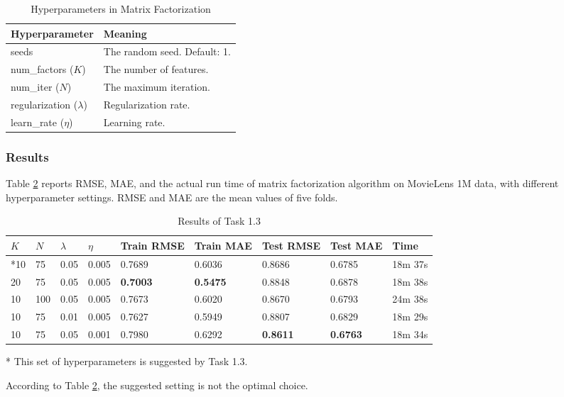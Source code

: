 \documentclass[12pt]{article}
\begin{document}
\begin{table}[ht]
    \centering
    \caption{Hyperparameters in Matrix Factorization}
    \label{tab:1.3-hyper}
    \begin{tabular}{ll}
        \toprule
        \textbf{Hyperparameter} & \textbf{Meaning}\\
        \midrule
        seeds & The random seed. Default: 1.\\
        num\_factors ($K$) & The number of features.\\
        num\_iter ($N$) & The maximum iteration.\\
        regularization ($\lambda$) & Regularization rate.\\
        learn\_rate ($\eta$) & Learning rate.\\
        \bottomrule
    \end{tabular}
\end{table}

\subsubsection{Results}
Table \ref{tab:1.3-results} reports RMSE, MAE, and the actual run time of matrix factorization algorithm on MovieLens 1M data, with different hyperparameter settings. RMSE and MAE are the mean values of five folds.
\begin{table}[ht]
    \centering
    \caption{Results of Task 1.3}
    \label{tab:1.3-results}
    \begin{threeparttable}
    \begin{tabular}{lllllllll}
        \toprule
        \textbf{$K$} & \textbf{$N$} & \textbf{$\lambda$} & \textbf{$\eta$} & \textbf{Train RMSE} & \textbf{Train MAE} & \textbf{Test RMSE} & \textbf{Test MAE} & \textbf{Time}\\
        \midrule
        *10 & 75 & 0.05 & 0.005 & 0.7689 & 0.6036 & 0.8686 & 0.6785 & 18m 37s\\
        20 & 75 & 0.05 & 0.005 & \textbf{0.7003} & \textbf{0.5475} & 0.8848 & 0.6878 & 18m 38s\\
        10 & 100 & 0.05 & 0.005 & 0.7673 & 0.6020 & 0.8670 & 0.6793 & 24m 38s\\
        10 & 75 & 0.01 & 0.005 & 0.7627 & 0.5949 & 0.8807 & 0.6829 & 18m 29s\\
        10 & 75 & 0.05 & 0.001 & 0.7980 & 0.6292 & \textbf{0.8611} & \textbf{0.6763} & 18m 34s\\
        \bottomrule
    \end{tabular}
    \begin{tablenotes}
        \footnotesize
        \item[*] This set of hyperparameters is suggested by Task 1.3.
    \end{tablenotes}
    \end{threeparttable}
\end{table}
\par
According to Table \ref{tab:1.3-results}, the suggested setting is not the optimal choice.
\end{document}
